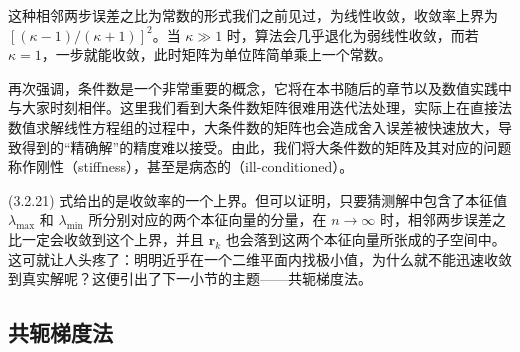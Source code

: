 这种相邻两步误差之比为常数的形式我们之前见过，为线性收敛，收敛率上界为 $[(\kappa-1)/(\kappa+1)]^2$。当 $\kappa\gg1$ 时，算法会几乎退化为弱线性收敛，而若 $\kappa=1$，一步就能收敛，此时矩阵为单位阵简单乘上一个常数。

再次强调，条件数是一个非常重要的概念，它将在本书随后的章节以及数值实践中与大家时刻相伴。这里我们看到大条件数矩阵很难用迭代法处理，实际上在直接法数值求解线性方程组的过程中，大条件数的矩阵也会造成舍入误差被快速放大，导致得到的“精确解”的精度难以接受。由此，我们将大条件数的矩阵及其对应的问题称作刚性（stiffness），甚至是病态的（ill-conditioned）。

(3.2.21) 式给出的是收敛率的一个上界。但可以证明，只要猜测解中包含了本征值 $\lambda_{\max}$ 和 $\lambda_{\min}$ 所分别对应的两个本征向量的分量，在 $n\to\infty$ 时，相邻两步误差之比一定会收敛到这个上界，并且 $\bm r_k$ 也会落到这两个本征向量所张成的子空间中。这可就让人头疼了：明明近乎在一个二维平面内找极小值，为什么就不能迅速收敛到真实解呢？这便引出了下一小节的主题——共轭梯度法。

\subsection{共轭梯度法}

